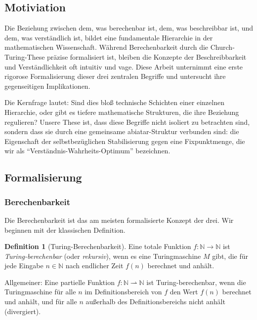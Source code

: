 \documentclass[a4paper,12pt]{article}
\theoremstyle{definition}
\newtheorem{definition}{Definition}
\begin{document}
\subsection{Motiviation}

Die Beziehung zwischen dem, was berechenbar ist, dem, was beschreibbar ist, und dem, was verständlich ist, bildet eine fundamentale Hierarchie in der mathematischen Wissenschaft. Während Berechenbarkeit durch die Church-Turing-These präzise formalisiert ist, bleiben die Konzepte der Beschreibbarkeit und Verständlichkeit oft intuitiv und vage. Diese Arbeit unternimmt eine erste rigorose Formalisierung dieser drei zentralen Begriffe und untersucht ihre gegenseitigen Implikationen.

Die Kernfrage lautet: Sind dies bloß technische Schichten einer einzelnen Hierarchie, oder gibt es tiefere mathematische Strukturen, die ihre Beziehung regulieren? Unsere These ist, dass diese Begriffe nicht isoliert zu betrachten sind, sondern dass sie durch eine gemeinsame abiatar-Struktur verbunden sind: die Eigenschaft der selbstbezüglichen Stabilisierung gegen eine Fixpunktmenge, die wir als ``Verständnis-Wahrheits-Optimum'' bezeichnen.

\subsection{Formalisierung}

\subsubsection{Berechenbarkeit}

Die Berechenbarkeit ist das am meisten formalisierte Konzept der drei. Wir beginnen mit der klassischen Definition.

\begin{definition}[Turing-Berechenbarkeit]
Eine totale Funktion $f: \mathbb{N} \to \mathbb{N}$ ist \textit{Turing-berechenbar} (oder \textit{rekursiv}), wenn es eine Turingmaschine $M$ gibt, die für jede Eingabe $n \in \mathbb{N}$ nach endlicher Zeit $f(n)$ berechnet und anhält.

Allgemeiner: Eine partielle Funktion $f: \mathbb{N} \rightharpoonup \mathbb{N}$ ist Turing-berechenbar, wenn die Turingmaschine für alle $n$ im Definitionsbereich von $f$ den Wert $f(n)$ berechnet und anhält, und für alle $n$ außerhalb des Definitionsbereichs nicht anhält (divergiert).
\end{definition}
\end{document}
